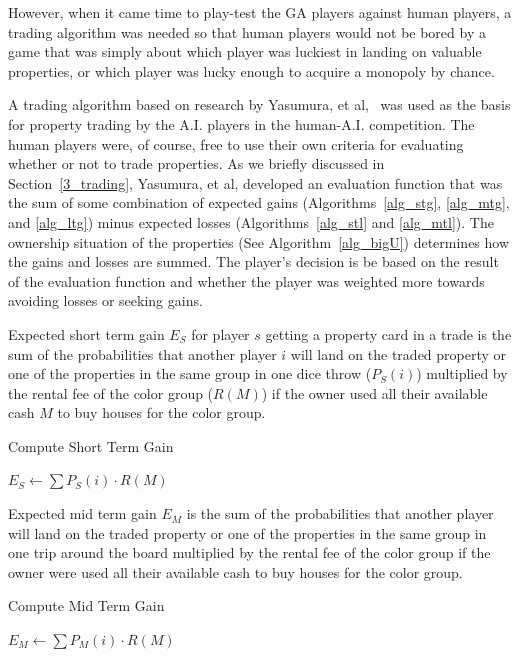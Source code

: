 However, when it came time to play-test the GA players against human players, a
trading algorithm was needed so that human players would not be bored by a game
that was simply about which player was luckiest in landing on valuable
properties, or which player was lucky enough to acquire a monopoly by chance.

A trading algorithm based on research by Yasumura, et
al,~\cite{Yasumura2001Negotiate} was used as the basis for property trading by
the A.I. players in the human-A.I. competition. The human players were, of
course, free to use their own criteria for evaluating whether or not to trade
properties. As we briefly discussed in Section~\ref{3_trading}, Yasumura, et al,
developed an evaluation function that was the sum of some combination of
expected gains (Algorithms~\ref{alg_stg}, \ref{alg_mtg}, and \ref{alg_ltg})
minus expected losses (Algorithms~\ref{alg_stl} and \ref{alg_mtl}). The
ownership situation of the properties (See Algorithm~\ref{alg_bigU}) determines
how the gains and losses are summed. The player's decision is be based on the
result of the evaluation function and whether the player was weighted more
towards avoiding losses or seeking gains.

Expected short term gain \(E_S\) for player \(s\) getting a property card in a
trade is the sum of the probabilities that another player \(i\) will land on the
traded property or one of the properties in the same group in one dice throw
(\(P_S(i)\)) multiplied by the rental fee of the color group (\(R(M)\)) if the
owner used all their available cash \(M\) to buy houses for the color group.
\begin{algorithm} 
\caption{Compute Short Term Gain}
\label{alg_stg}
\begin{algorithmic}
   \STATE $E_S \gets \sum P_S(i) \cdot R(M)$ 
\end{algorithmic}
\end{algorithm}

Expected mid term gain \(E_M\) is the sum of the probabilities that another
player will land on the traded property or one of the properties in the same group in
one trip around the board multiplied by the rental fee of the color group if the
owner were used all their available cash to buy houses for the color group.
\begin{algorithm} 
\caption{Compute Mid Term Gain}
\label{alg_mtg}
\begin{algorithmic}
   \STATE $E_M \gets \sum P_M(i) \cdot R(M)$ 
\end{algorithmic}
\end{algorithm}

